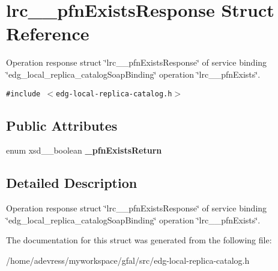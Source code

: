 \section{lrc\_\-\_\-pfn\-Exists\-Response Struct Reference}
\label{structlrc____pfnExistsResponse}
Operation response struct \char`\"{}lrc\_\-\_\-pfn\-Exists\-Response\char`\"{} of service binding \char`\"{}edg\_\-local\_\-replica\_\-catalog\-Soap\-Binding\char`\"{} operation \char`\"{}lrc\_\-\_\-pfn\-Exists\char`\"{}.  


{\tt \#include $<$edg-local-replica-catalog.h$>$}

\subsection*{Public Attributes}
\begin{CompactItemize}
\item 
enum xsd\_\-\_\-boolean \textbf{\_\-pfn\-Exists\-Return}\label{structlrc____pfnExistsResponse_70f671b5d862e54250506aaaa7ff3832}

\end{CompactItemize}


\subsection{Detailed Description}
Operation response struct \char`\"{}lrc\_\-\_\-pfn\-Exists\-Response\char`\"{} of service binding \char`\"{}edg\_\-local\_\-replica\_\-catalog\-Soap\-Binding\char`\"{} operation \char`\"{}lrc\_\-\_\-pfn\-Exists\char`\"{}. 



The documentation for this struct was generated from the following file:\begin{CompactItemize}
\item 
/home/adevress/myworkspace/gfal/src/edg-local-replica-catalog.h\end{CompactItemize}
